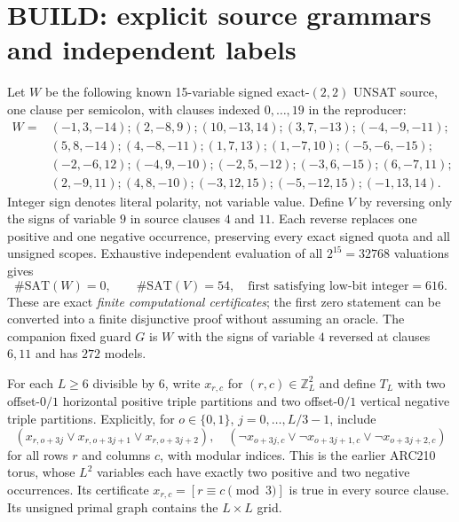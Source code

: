 \documentclass[10pt]{article}
\begin{document}
\section{BUILD: explicit source grammars and independent labels}
Let $W$ be the following known 15-variable signed exact-$(2,2)$ UNSAT source, one clause per semicolon, with clauses indexed $0,\ldots,19$ in the reproducer:
\begin{align*}
W={}&(-1,3,-14);(2,-8,9);(10,-13,14);(3,7,-13);(-4,-9,-11);\\
   &(5,8,-14);(4,-8,-11);(1,7,13);(1,-7,10);(-5,-6,-15);\\
   &(-2,-6,12);(-4,9,-10);(-2,5,-12);(-3,6,-15);(6,-7,11);\\
   &(2,-9,11);(4,8,-10);(-3,12,15);(-5,-12,15);(-1,13,14).
\end{align*}
Integer sign denotes literal polarity, not variable value. Define $V$ by reversing only the signs of variable $9$ in source clauses $4$ and $11$. Each reverse replaces one positive and one negative occurrence, preserving every exact signed quota and all unsigned scopes. Exhaustive independent evaluation of all $2^{15}=32768$ valuations gives
\[
 \#\mathrm{SAT}(W)=0,\qquad \#\mathrm{SAT}(V)=54,
 \quad\text{first satisfying low-bit integer}=616.
\]
These are exact \emph{finite computational certificates}; the first zero statement can be converted into a finite disjunctive proof without assuming an oracle. The companion fixed guard $G$ is $W$ with the signs of variable $4$ reversed at clauses $6,11$ and has $272$ models.

For each $L\ge6$ divisible by $6$, write $x_{r,c}$ for $(r,c)\in\mathbb Z_L^2$ and define $T_L$ with two offset-$0/1$ horizontal positive triple partitions and two offset-$0/1$ vertical negative triple partitions. Explicitly, for $o\in\{0,1\}$, $j=0,\ldots,L/3-1$, include
\[
(x_{r,o+3j}\vee x_{r,o+3j+1}\vee x_{r,o+3j+2}),\quad
(\neg x_{o+3j,c}\vee\neg x_{o+3j+1,c}\vee\neg x_{o+3j+2,c})
\]
for all rows $r$ and columns $c$, with modular indices. This is the earlier ARC210 torus, whose $L^2$ variables each have exactly two positive and two negative occurrences. Its certificate $x_{r,c}=[r\equiv c\pmod3]$ is true in every source clause. Its unsigned primal graph contains the $L\times L$ grid.
\end{document}
